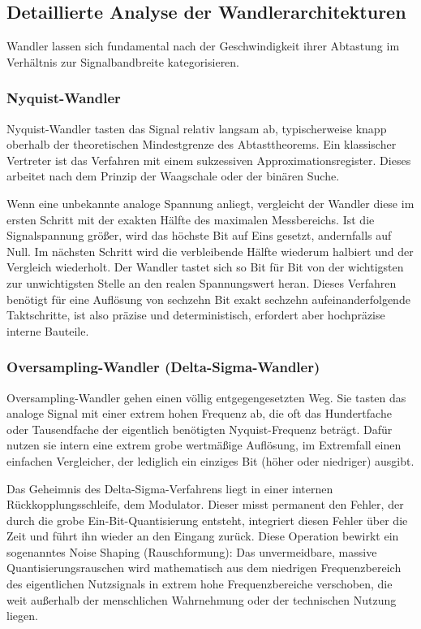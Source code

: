 \documentclass[11pt,a4paper]{article}
\begin{document}
\subsection{Detaillierte Analyse der Wandlerarchitekturen}

Wandler lassen sich fundamental nach der Geschwindigkeit ihrer Abtastung im Verhältnis zur Signalbandbreite kategorisieren.

\subsubsection{Nyquist-Wandler}
Nyquist-Wandler tasten das Signal relativ langsam ab, typischerweise knapp oberhalb der theoretischen Mindestgrenze des Abtasttheorems. Ein klassischer Vertreter ist das Verfahren mit einem sukzessiven Approximationsregister. Dieses arbeitet nach dem Prinzip der Waagschale oder der binären Suche. 

Wenn eine unbekannte analoge Spannung anliegt, vergleicht der Wandler diese im ersten Schritt mit der exakten Hälfte des maximalen Messbereichs. Ist die Signalspannung größer, wird das höchste Bit auf Eins gesetzt, andernfalls auf Null. Im nächsten Schritt wird die verbleibende Hälfte wiederum halbiert und der Vergleich wiederholt. Der Wandler tastet sich so Bit für Bit von der wichtigsten zur unwichtigsten Stelle an den realen Spannungswert heran. Dieses Verfahren benötigt für eine Auflösung von sechzehn Bit exakt sechzehn aufeinanderfolgende Taktschritte, ist also präzise und deterministisch, erfordert aber hochpräzise interne Bauteile.

\subsubsection{Oversampling-Wandler (Delta-Sigma-Wandler)}
Oversampling-Wandler gehen einen völlig entgegengesetzten Weg. Sie tasten das analoge Signal mit einer extrem hohen Frequenz ab, die oft das Hundertfache oder Tausendfache der eigentlich benötigten Nyquist-Frequenz beträgt. Dafür nutzen sie intern eine extrem grobe wertmäßige Auflösung, im Extremfall einen einfachen Vergleicher, der lediglich ein einziges Bit (höher oder niedriger) ausgibt.

Das Geheimnis des Delta-Sigma-Verfahrens liegt in einer internen Rückkopplungsschleife, dem Modulator. Dieser misst permanent den Fehler, der durch die grobe Ein-Bit-Quantisierung entsteht, integriert diesen Fehler über die Zeit und führt ihn wieder an den Eingang zurück. Diese Operation bewirkt ein sogenanntes Noise Shaping (Rauschformung): Das unvermeidbare, massive Quantisierungsrauschen wird mathematisch aus dem niedrigen Frequenzbereich des eigentlichen Nutzsignals in extrem hohe Frequenzbereiche verschoben, die weit außerhalb der menschlichen Wahrnehmung oder der technischen Nutzung liegen.
\end{document}
